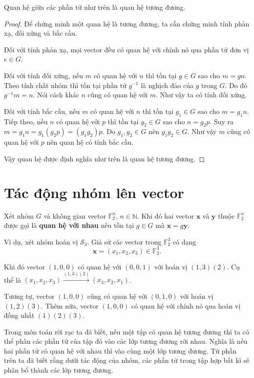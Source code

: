 \documentclass{mynotes}
\newcommand{\FF}{\mathbb{F}}
\newcommand{\NN}{\mathbb{N}}
\begin{document}
\begin{remark}
    Quan hệ giữa các phần tử như trên là quan hệ tương đương.    
\end{remark}


\begin{proof}
    Để chứng minh một quan hệ là tương đương, ta cần chứng minh tính phản xạ, đối xứng và bắc cầu.

    Đối với tính phản xạ, mọi vector đều có quan hệ với chính nó qua phần tử đơn vị $e \in G$.

    Đối với tính đối xứng, nếu $m$ có quan hệ với $n$ thì tồn tại $g \in G$ sao cho $m = gn$. Theo tính chất nhóm thì tồn tại phần tử $g^{-1}$ là nghịch đảo của $g$ trong $G$. Do đó $g^{-1} m = n$. Nói cách khác $n$ cũng có quan hệ với $m$. Như vậy ta có tính đối xứng.

    Đối với tính bắc cầu, nếu $m$ có quan hệ với $n$ thì tồn tại $g_1 \in G$ sao cho $m = g_1 n$. Tiếp theo, nếu $n$ có quan hệ với $p$ thì tồn tại $g_2 \in G$ sao cho $n = g_2 p$. Suy ra $m = g_1 n = g_1 (g_2 p) = (g_1 g_2) p$. Do $g_1, g_2 \in G$ nên $g_1 g_2 \in G$. Như vậy $m$ cũng có quan hệ với $p$ nên quan hệ có tính bắc cầu.

    Vậy quan hệ được định nghĩa như trên là quan hệ tương đương.
\end{proof}

\section{Tác động nhóm lên vector}

Xét nhóm $G$ và không gian vector $\FF_2^n$, $n \in \NN$. Khi đó hai vector $\bm{x}$ và $\bm{y}$ thuộc $\FF_2^n$ được gọi là \textbf{quan hệ với nhau} nếu tồn tại $g \in G$ mà $\bm{x} = g \bm{y}$.

Ví dụ, xét nhóm hoán vị $\mathcal{S}_3$. Giả sử các vector trong $\FF_2^3$ có dạng \[ \bm{x} = (x_1, x_2, x_3) \in \FF_2^3. \] 

Khi đó vector $(1, 0, 0)$ có quan hệ với $(0, 0, 1)$ với hoán vị $(1, 3)(2)$. Cụ thể là $(x_1, x_2, x_3) \xrightarrow{(1, 3)(2)} (x_3, x_2, x_1)$.

Tương tự, vector $(1, 0, 0)$ cũng có quan hệ với $(0, 1, 0)$ với hoán vị $(1, 2)(3)$. Thêm nữa, vector $(1, 0, 0)$ có quan hệ với chính nó qua hoán vị đồng nhất $(1)(2)(3)$.

Trong môn toán rời rạc ta đã biết, nếu một tập có quan hệ tương đương thì ta có thể phân các phần tử của tập đó vào các lớp tương đương rời nhau. Nghĩa là nếu hai phần tử có quan hệ với nhau thì vào cùng một lớp tương đương. Từ phần trên ta đã biết rằng dưới tác động của nhóm, các phần tử trong tập hợp bất kì sẽ phân bổ thành các lớp tương đương.
\end{document}
